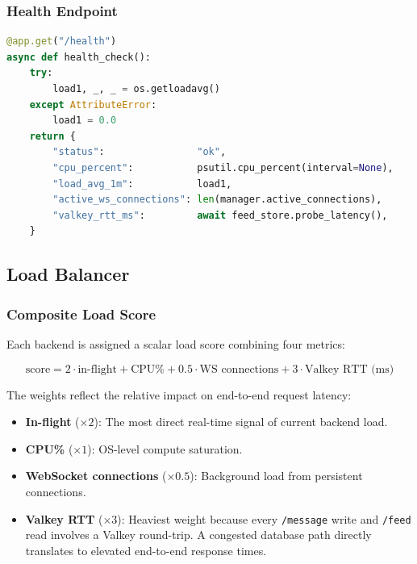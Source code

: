 \documentclass[12pt,a4paper]{article}
\begin{document}
\subsubsection{Health Endpoint}

\begin{lstlisting}[language=Python, caption={/health endpoint providing metrics for LB load scoring}]
@app.get("/health")
async def health_check():
    try:
        load1, _, _ = os.getloadavg()
    except AttributeError:
        load1 = 0.0
    return {
        "status":                "ok",
        "cpu_percent":           psutil.cpu_percent(interval=None),
        "load_avg_1m":           load1,
        "active_ws_connections": len(manager.active_connections),
        "valkey_rtt_ms":         await feed_store.probe_latency(),
    }
\end{lstlisting}

\subsection{Load Balancer}

\subsubsection{Composite Load Score}

Each backend is assigned a scalar load score combining four metrics:

\begin{equation}
\text{score} = 2 \cdot \text{in-flight} + \text{CPU\%} + 0.5 \cdot \text{WS connections} + 3 \cdot \text{Valkey RTT (ms)}
\end{equation}

The weights reflect the relative impact on end-to-end request latency:
\begin{itemize}
    \item \textbf{In-flight} ($\times 2$): The most direct real-time signal of current backend load.
    \item \textbf{CPU\%} ($\times 1$): OS-level compute saturation.
    \item \textbf{WebSocket connections} ($\times 0.5$): Background load from persistent connections.
    \item \textbf{Valkey RTT} ($\times 3$): Heaviest weight because every \texttt{/message} write and \texttt{/feed} read involves a Valkey round-trip. A congested database path directly translates to elevated end-to-end response times.
\end{itemize}
\end{document}

